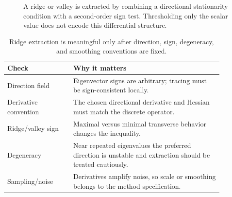 \begin{figure}[htbp]
\centering
{}
\caption{A ridge or valley is extracted by combining a directional stationarity condition
with a second-order sign test. Thresholding only the scalar value does not encode this
differential structure.}
\label{fig:vii42-c07-ridge-pipeline}
\end{figure}

\begin{table}[htbp]
\centering\small
\begin{tabular}{p{0.27\linewidth}p{0.61\linewidth}}
\toprule
Check & Why it matters\\
\midrule
Direction field & Eigenvector signs are arbitrary; tracing must be sign-consistent locally.\\
Derivative convention & The chosen directional derivative and Hessian must match the discrete operator.\\
Ridge/valley sign & Maximal versus minimal transverse behavior changes the inequality.\\
Degeneracy & Near repeated eigenvalues the preferred direction is unstable and extraction should be treated cautiously.\\
Sampling/noise & Derivatives amplify noise, so scale or smoothing belongs to the method specification.\\
\bottomrule
\end{tabular}
\caption{Ridge extraction is meaningful only after direction, sign, degeneracy, and smoothing conventions are fixed.}
\label{tab:vii42-c07-ridge-conventions}
\end{table}
